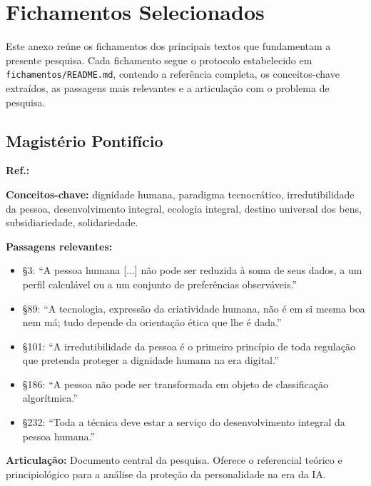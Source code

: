 
\chapter{Fichamentos Selecionados}
\label{anexo:fichamentos}

Este anexo reúne os fichamentos dos principais textos que fundamentam a presente pesquisa. Cada fichamento segue o protocolo estabelecido em \texttt{fichamentos/README.md}, contendo a referência completa, os conceitos-chave extraídos, as passagens mais relevantes e a articulação com o problema de pesquisa.

\section{Magistério Pontifício}

\begin{fichamento}
    \textbf{Ref.:} \cite{LeaoXIV2026MH}
    
    \textbf{Conceitos-chave:} dignidade humana, paradigma tecnocrático, irredutibilidade da pessoa, desenvolvimento integral, ecologia integral, destino universal dos bens, subsidiariedade, solidariedade.
    
    \textbf{Passagens relevantes:}
    \begin{itemize}
        \item §3: ``A pessoa humana [...] não pode ser reduzida à soma de seus dados, a um perfil calculável ou a um conjunto de preferências observáveis.''
        \item §89: ``A tecnologia, expressão da criatividade humana, não é em si mesma boa nem má; tudo depende da orientação ética que lhe é dada.''
        \item §101: ``A irredutibilidade da pessoa é o primeiro princípio de toda regulação que pretenda proteger a dignidade humana na era digital.''
        \item §186: ``A pessoa não pode ser transformada em objeto de classificação algorítmica.''
        \item §232: ``Toda a técnica deve estar a serviço do desenvolvimento integral da pessoa humana.''
    \end{itemize}
    
    \textbf{Articulação:} Documento central da pesquisa. Oferece o referencial teórico e principiológico para a análise da proteção da personalidade na era da IA.
\end{fichamento}

